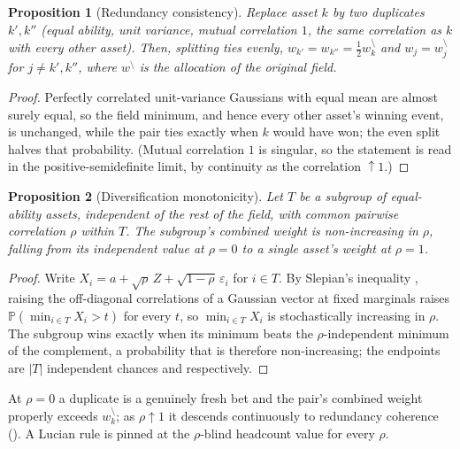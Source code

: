 \documentclass[11pt]{article}
\newtheorem{proposition}{Proposition}
\newcommand{\Prob}{\mathbb{P}}
\begin{document}
\begin{proposition}[Redundancy consistency]
\label{prop:redundancy}
Replace asset $k$ by two duplicates $k', k''$ (equal ability, unit variance,
mutual correlation $1$, the same correlation as $k$ with every other asset).
Then, splitting ties evenly,
$w_{k'} = w_{k''} = \tfrac12 w_k^{\setminus}$ and $w_j = w_j^{\setminus}$ for
$j \ne k', k''$, where $w^{\setminus}$ is the allocation of the original field.
\end{proposition}
\begin{proof}
Perfectly correlated unit-variance Gaussians with equal mean are almost surely
equal, so the field minimum, and hence every other asset's winning event, is
unchanged, while the pair ties exactly when $k$ would have won; the even split
halves that probability. (Mutual correlation $1$ is singular, so the statement
is read in the positive-semidefinite limit, by continuity as the correlation
$\uparrow 1$.)
\end{proof}

\begin{proposition}[Diversification monotonicity]
\label{prop:monotone}
Let $T$ be a subgroup of equal-ability assets, independent of the rest of the
field, with common pairwise correlation $\rho$ within $T$. The subgroup's
combined weight is non-increasing in $\rho$, falling from its independent
value at $\rho = 0$ to a single asset's weight at $\rho = 1$.
\end{proposition}
\begin{proof}
Write $X_i = a + \sqrt{\rho}\,Z + \sqrt{1-\rho}\,\varepsilon_i$ for $i \in T$.
By Slepian's inequality \parencite{slepian1962}, raising the off-diagonal
correlations of a Gaussian vector at fixed marginals raises
$\Prob(\min_{i\in T} X_i > t)$ for every $t$, so $\min_{i\in T} X_i$ is
stochastically increasing in $\rho$. The subgroup wins exactly when its
minimum beats the $\rho$-independent minimum of the complement, a probability
that is therefore non-increasing; the endpoints are $|T|$ independent chances
and  respectively.
\end{proof}

At $\rho = 0$ a duplicate is a genuinely fresh bet and the pair's combined
weight properly exceeds $w_k^{\setminus}$; as $\rho \uparrow 1$ it descends
continuously to redundancy coherence (). A Lucian rule is
pinned at the $\rho$-blind headcount value for every $\rho$.
\end{document}
